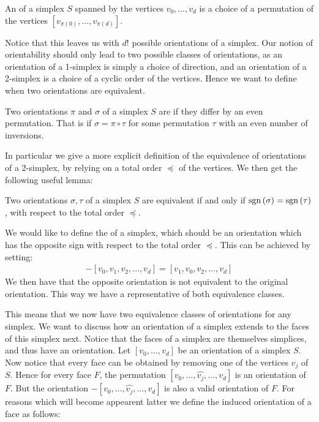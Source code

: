 \begin{definition}
	An  of a simplex $S$ spanned by the vertices $v_0, \dots, v_d$ is a choice of a permutation of the vertices $[v_{\pi(0)}, \dots, v_{\pi(d)}]$.
\end{definition}

Notice that this leaves us with $d!$ possible orientations of a simplex. Our notion of orientability should only lead to two possible classes of orientations, as an orientation of a 1-simplex is simply a choice of direction, and an orientation of a 2-simplex is a choice of a cyclic order of the vertices. Hence we want to define when two orientations are equivalent.

\begin{definition}
	Two orientations $\pi$ and $\sigma$ of a simplex $S$ are  if they differ by an even permutation. That is if $\sigma = \pi \circ \tau$ for some permutation $\tau$ with an even number of inversions.
\end{definition}

In particular we give a more explicit definition of the equivalence of orientations of a 2-simplex, by relying on a total order $\preceq$ of the vertices. We then get the following useful lemma:

\begin{lemma}
	Two orientations $\sigma, \tau$ of a simplex $S$ are equivalent if and only if $\operatorname{sgn}\left(\sigma\right) = \operatorname{sgn}\left(\tau\right)$, with respect to the total order $\preceq$.
\end{lemma}

We would like to define the  of a simplex, which should be an orientation which has the opposite sign with respect to the total order $\preceq$. This can be achieved by setting:
\begin{align*}
	- [v_0, v_1, v_2, \dots, v_d] = [v_1, v_0, v_2, \dots, v_d]
\end{align*}
We then have that the opposite orientation is not equivalent to the original orientation. This way we have a representative of both equivalence classes.

This means that we now have two equivalence classes of orientations for any simplex. We want to discuss how an orientation of a simplex extends to the faces of this simplex next. Notice that the faces of a simplex are themselves simplices, and thus have an orientation. Let $[v_0, \dots, v_{d}]$ be an orientation of a simplex $S$. Now notice that every face can be obtained by removing one of the vertices $v_j$ of $S$. Hence for every face $F$, the permutation $[v_0, \dots, \hat{v_j}, \dots, v_{d}]$ is an orientation of $F$. But the orientation $- [v_0, \dots, \hat{v_j}, \dots, v_{d}]$ is also a valid orientation of $F$. For reasons which will become appearent latter we define the induced orientation of a face as follows:

